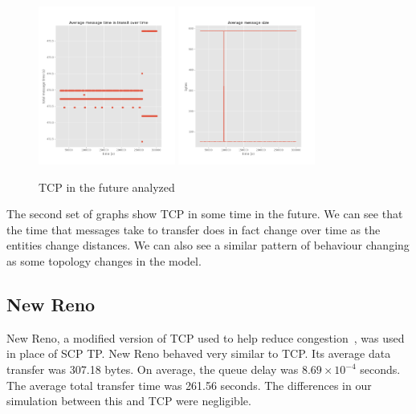 \documentclass[a4paper,12pt]{article}
\begin{document}
\begin{figure}[h]
  \centering
  \includegraphics[width=0.4\textwidth]{media/tcp_future.png}
  \includegraphics[width=0.4\textwidth]{media/tcp_future_data.png}
  \caption{TCP in the future analyzed}
\end{figure}

The second set of graphs show TCP in some time in the future. We can see that
the time that messages take to transfer does in fact change over time as the
entities change distances. We can also see a similar pattern of behaviour
changing as some topology changes in the model.

\subsection{New Reno}

New Reno, a modified version of TCP used to help reduce
congestion~\cite{Nahar2016}, was used in place of SCP TP. New Reno behaved very
similar to TCP. Its average data transfer was 307.18 bytes. On average, the
queue delay was $8.69\times10^{-4}$ seconds. The average total transfer time was
261.56 seconds. The differences in our simulation between this and TCP were
negligible.
\end{document}
